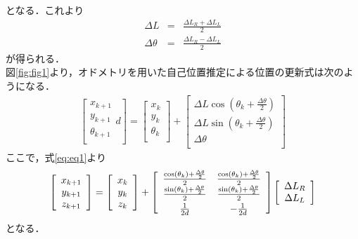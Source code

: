   となる．これより
  \begin{eqnarray}
   \Delta L &=& \frac{\Delta L_R + \Delta L_L}{2} \nonumber \\
   \Delta \theta &=& \frac{\Delta L_R - \Delta L_L}{2}
    \label{eq:eq1}
  \end{eqnarray}
  が得られる．\\
  図\ref{fig:fig1}より，オドメトリを用いた自己位置推定による位置の更新式は次のようになる．
   \begin{eqnarray}
    \left[
     \begin{array}{c}
      x_{k+1} \\
      y_{k+1} \\ 
      \theta_{k+1} \\
     \end{array}d
	\right]
    = \left[
       \begin{array}{c}
 x_k \\ 
 y_k \\
 \theta_k \\
       \end{array}
\right]
+ \left[
\begin{array}{c}
 \Delta L \cos(\theta_k + \frac{\Delta \theta}{2}) \\
 \Delta L \sin(\theta_k + \frac{\Delta \theta}{2}) \\
 \Delta \theta\\
\end{array}
\right]
   \end{eqnarray}
ここで，式\ref{eq:eq1}より
\begin{equation}
\left[
 \begin{array}{c}
  x_{k+1} \\
  y_{k+1} \\
  z_{k+1} \\
 \end{array}
\right] 
= \left[
\begin{array}{c}
 x_k \\
 y_k \\
 z_k \\
\end{array}
\right]
+ \left[
\begin{array}{cc}
 \frac{\cos(\theta_k) + \frac{\Delta \theta}{2}}{2} & \frac{\cos(\theta_k) + \frac{\Delta \theta}{2}}{2} \\
 \frac{\sin(\theta_k) + \frac{\Delta \theta}{2}}{2} & \frac{\sin(\theta_k) + \frac{\Delta \theta}{2}}{2} \vspace{1mm}\\
 \frac{1}{2d} & -\frac{1}{2d} \\
\end{array}
\right]
\left[
\begin{array}{c}
 \Delta L_R \\
 \Delta L_L \\
\end{array}
\right]
\end{equation}
となる．

